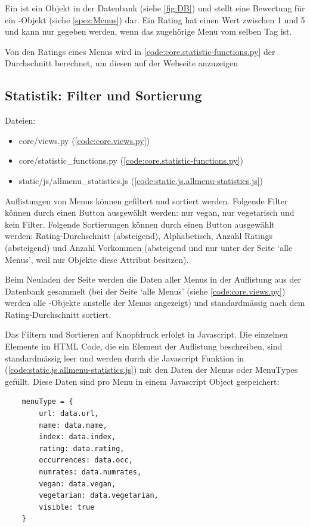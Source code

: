Ein  ist ein Objekt in der Datenbank (siehe \ref{fig:DB}) und stellt
eine Bewertung für ein -Objekt (siehe \ref{spez:Menus}) dar. Ein
Rating hat einen Wert zwischen 1 und 5 und kann nur gegeben werden, wenn das
zugehörige Menu vom selben Tag ist.

Von den Ratings eines Menus wird in 
\ref{code:core.statistic-functions.py} der Durchschnitt berechnet, um diesen auf
der Webseite anzuzeigen


\subsection{Statistik: Filter und Sortierung} \label{spez:Statistik}

Dateien:
\begin{itemize}
    \item core/views.py (\ref{code:core.views.py})
    \item core/statistic\_functions.py (\ref{code:core.statistic-functions.py})
    \item static/js/allmenu\_statistics.js (\ref{code:static.js.allmenu-statistics.js})
\end{itemize}

Auflistungen von Menus können gefiltert und sortiert werden. Folgende Filter
können durch einen Button ausgewählt werden: nur vegan, nur vegetarisch und kein
Filter. Folgende Sortierungen können durch einen Button ausgewählt werden:
Rating-Durchschnitt (absteigend), Alphabetisch, Anzahl Ratings (absteigend) und Anzahl
Vorkommen (absteigend und nur unter der Seite `alle Menus', weil nur 
Objekte diese Attribut besitzen).

Beim Neuladen der Seite werden die Daten aller Menus in der Auflistung aus der
Datenbank gesammelt (bei der Seite `alle Menus' (siehe \ref{code:core.views.py})
werden alle -Objekte anstelle der Menus angezeigt) und
standardmässig nach dem Rating-Durchschnitt sortiert. 

Das Filtern und Sortieren auf Knopfdruck erfolgt in Javascript. Die einzelnen
 Elemente im HTML Code, die ein Element der Auflistung beschreiben,
sind standardmässig leer und werden durch die Javascript Funktion
 in 
(\ref{code:static.js.allmenu-statistics.js}) mit den Daten der Menus oder
MenuTypes gefüllt. Diese Daten sind pro Menu in einem Javascript Object
gespeichert:

\begin{lstlisting}
    menuType = {
        url: data.url,
        name: data.name,
        index: data.index,
        rating: data.rating,
        occurrences: data.occ,
        numrates: data.numrates,
        vegan: data.vegan,
        vegetarian: data.vegetarian,
        visible: true
    }
\end{lstlisting}


